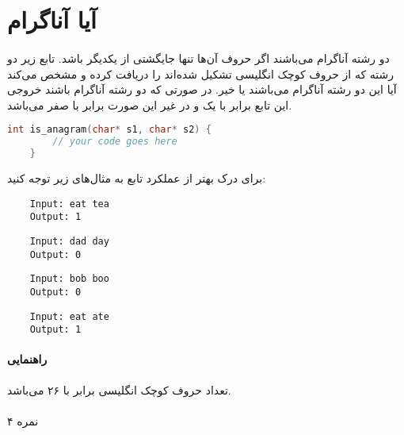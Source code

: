 \documentclass[../main.tex]{subfiles}
\begin{document}
\section{آیا آناگرام}
\paragraph{}
دو رشته آناگرام می‌باشند اگر حروف آن‌ها تنها جایگشتی از یکدیگر باشد.
تابع زیر دو رشته که از حروف کوچک انگلیسی تشکیل شده‌اند را دریافت کرده و مشخص می‌کند
آیا این دو رشته آناگرام می‌باشند یا خیر.
در صورتی که دو رشته آناگرام باشند خروجی این تابع برابر با یک و در غیر این صورت برابر با صفر می‌باشد.

\begin{latin}
\begin{lstlisting}[language=c]
    int is_anagram(char* s1, char* s2) {
        // your code goes here
    }
\end{lstlisting}
\end{latin}

برای درک بهتر از عملکرد تابع به مثال‌های زیر توجه کنید:

\begin{latin}
\begin{verbatim}
    Input: eat tea
    Output: 1
\end{verbatim}

\begin{verbatim}
    Input: dad day
    Output: 0
\end{verbatim}

\begin{verbatim}
    Input: bob boo
    Output: 0
\end{verbatim}

\begin{verbatim}
    Input: eat ate
    Output: 1
\end{verbatim}
\end{latin}

\paragraph{راهنمایی}
تعداد حروف کوچک انگلیسی برابر با ۲۶ می‌باشد.

\paragraph{}
۴ نمره
\end{document}
